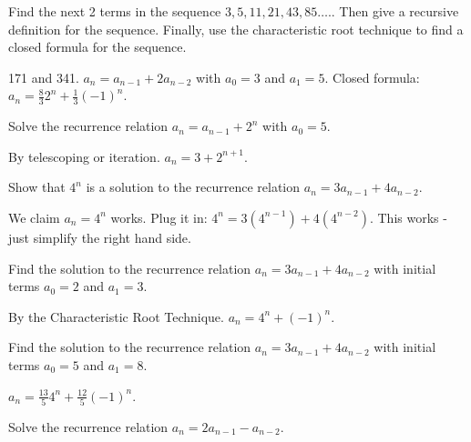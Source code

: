 \begin{questions}

\question Find the next 2 terms in the sequence $3, 5, 11, 21, 43, 85\ldots.$.  Then give a recursive definition for the sequence.  Finally, use the characteristic root technique to find a closed formula for the sequence.

	\begin{answer}
		171 and 341.  $a_n = a_{n-1} + 2a_{n-2}$ with $a_0 = 3$ and $a_1 = 5$.  Closed formula: $a_n = \frac{8}{3}2^n + \frac{1}{3}(-1)^n$.
	\end{answer}
	
	
	


\question Solve the recurrence relation $a_n = a_{n-1} + 2^n$ with $a_0 = 5$.

	\begin{answer}
		By telescoping or iteration.  $a_n = 3 + 2^{n+1}$.
	\end{answer}
	
	
	


\question Show that $4^n$ is a solution to the recurrence relation $a_n = 3a_{n-1} + 4a_{n-2}$.

	\begin{answer}
		We claim $a_n = 4^n$ works.  Plug it in: $4^n = 3(4^{n-1}) + 4(4^{n-2})$.  This works - just simplify the right hand side.
	\end{answer}
	
	
	


\question Find the solution to the recurrence relation $a_n = 3a_{n-1} + 4a_{n-2}$ with initial terms $a_0 = 2$ and $a_1 = 3$.

	\begin{answer}
		By the Characteristic Root Technique.  $a_n = 4^n + (-1)^n$.
	\end{answer}
	
	
	


\question Find the solution to the recurrence relation $a_n = 3a_{n-1} + 4a_{n-2}$ with initial terms $a_0 = 5$ and $a_1 = 8$.

	\begin{answer}
		$a_n = \frac{13}{5} 4^n + \frac{12}{5} (-1)^n$.
	\end{answer}
	
	
	


\question Solve the recurrence relation $a_n = 2a_{n-1} - a_{n-2}$.
\begin{parts}

\end{parts}
\end{questions}
